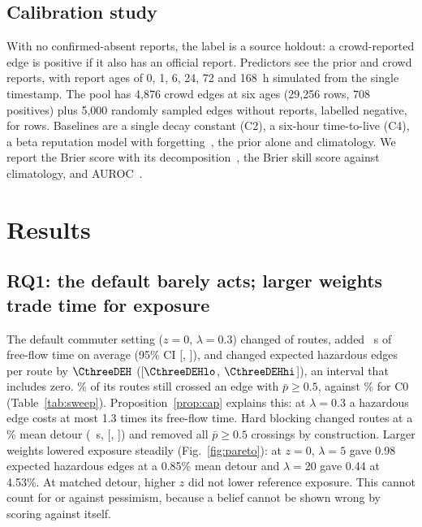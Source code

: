 \documentclass[conference]{IEEEtran}
\begin{document}
\subsection{Calibration study}
With no confirmed-absent reports, the label is a source holdout: a crowd-reported edge is positive if it also has an official report. Predictors see the prior and crowd reports, with report ages of 0, 1, 6, 24, 72 and 168~h simulated from the single timestamp. The pool has 4,876 crowd edges at six ages (29,256 rows, 708 positives) plus 5,000 randomly sampled edges without reports, labelled negative, for \CalN{} rows. Baselines are a single decay constant (C2), a six-hour time-to-live (C4), a beta reputation model with forgetting~\cite{josang2002beta}, the prior alone and climatology. We report the Brier score with its decomposition~\cite{brier1950verification,murphy1973partition}, the Brier skill score against climatology, and AUROC~\cite{fawcett2006roc}.

\section{Results}\label{sec:results}
\subsection{RQ1: the default barely acts; larger weights trade time for exposure}
The default commuter setting ($z=0$, $\lambda=0.3$) changed \CthreeChanged{} of \NOD{} routes, added \CthreeDFF~s of free-flow time on average (95\% CI [\CthreeDFFlo, \CthreeDFFhi]), and changed expected hazardous edges per route by $\CthreeDEH$ ([$\CthreeDEHlo$, $\CthreeDEHhi$]), an interval that includes zero. \ShareHRCthree\% of its routes still crossed an edge with $\bar p\ge0.5$, against \ShareHRCzero\% for C0 (Table~\ref{tab:sweep}). Proposition~\ref{prop:cap} explains this: at $\lambda=0.3$ a hazardous edge costs at most 1.3 times its free-flow time. Hard blocking changed \ConeChanged{} routes at a \ConeRatio\% mean detour (\ConeDFF~s, [\ConeDFFlo, \ConeDFFhi]) and removed all $\bar p\ge0.5$ crossings by construction. Larger weights lowered exposure steadily (Fig.~\ref{fig:pareto}): at $z=0$, $\lambda=5$ gave 0.98 expected hazardous edges at a 0.85\% mean detour and $\lambda=20$ gave 0.44 at 4.53\%. At matched detour, higher $z$ did not lower reference exposure. This cannot count for or against pessimism, because a belief cannot be shown wrong by scoring against itself.

\begin{table}[t]
\centering
\caption{Route Exposure Under a Common Reference Belief (C3 $\bar p$ at the Replay Clock), 100 Origin--Destination Pairs}
\label{tab:sweep}
\footnotesize

\end{table}
\end{document}
